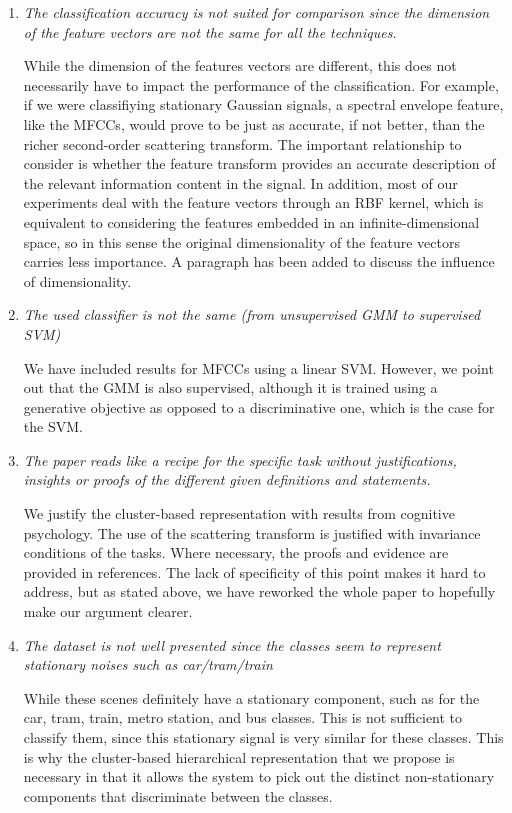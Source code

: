 \documentclass[10pt]{article}
\begin{document}
\begin{enumerate}
\item \emph{The classification accuracy is not suited for comparison since the dimension of the feature vectors are not the same for all the techniques.}

While the dimension of the features vectors are different, this does not necessarily have to impact the performance of the classification. For example, if we were classifiying stationary Gaussian signals, a spectral envelope feature, like the MFCCs, would prove to be just as accurate, if not better, than the richer second-order scattering transform. The important relationship to consider is whether the feature transform provides an accurate description of the relevant information content in the signal. In addition, most of our experiments deal with the feature vectors through an RBF kernel, which is equivalent to considering the features embedded in an infinite-dimensional space, so in this sense the original dimensionality of the feature vectors carries less importance. A paragraph has been added to discuss the influence of dimensionality.

\item \emph{The used classifier is not the same (from unsupervised GMM to supervised SVM)}

We have included results for MFCCs using a linear SVM. However, we point out that the GMM is also supervised, although it is trained using a generative objective as opposed to a discriminative one, which is the case for the SVM.

\item \emph{The paper reads like a recipe for the specific task without justifications, insights or proofs of the different given definitions and statements.}

We justify the cluster-based representation with results from cognitive psychology. The use of the scattering transform is justified with invariance conditions of the tasks. Where necessary, the proofs and evidence are provided in references. The lack of specificity of this point makes it hard to address, but as stated above, we have reworked the whole paper to hopefully make our argument clearer.

\item \emph{The dataset is not well presented since the classes seem to represent stationary noises such as car/tram/train}

While these scenes definitely have a stationary component, such as for the car, tram, train, metro station, and bus classes. This is not sufficient to classify them, since this stationary signal is very similar for these classes. This is why the cluster-based hierarchical representation that we propose is necessary in that it allows the system to pick out the distinct non-stationary components that discriminate between the classes.


\end{enumerate}
\end{document}
